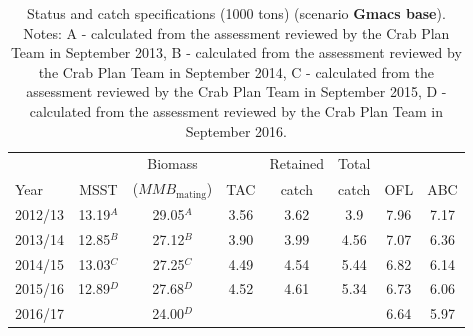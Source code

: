 \documentclass[]{article}
\begin{document}
\begin{table}[ht]
\centering
\caption{Status and catch specifications (1000 tons) (scenario {\bf Gmacs base}). Notes: A - calculated from the assessment reviewed by the Crab Plan Team in September 2013, B - calculated from the assessment reviewed by the Crab Plan Team in September 2014, C - calculated from the assessment reviewed by the Crab Plan Team in September 2015, D - calculated from the assessment reviewed by the Crab Plan Team in September 2016.} 
\label{tab:status}
\begin{tabular}{lccccccc}
\hline
          &          & Biomass                        &     & Retained & Total &     & \\ 
Year      & MSST     & ($\mathit{MMB}_\text{mating}$) & TAC & catch    & catch & OFL & ABC \\ 
\hline
2012/13   & 13.19$^A$   & 29.05$^A$   & 3.56 & 3.62 & 3.9  & 7.96 & 7.17 \\
2013/14   & 12.85$^B$   & 27.12$^B$   & 3.90 & 3.99 & 4.56 & 7.07 & 6.36 \\
2014/15   & 13.03$^C$   & 27.25$^C$   & 4.49 & 4.54 & 5.44 & 6.82 & 6.14 \\
2015/16   & 12.89$^D$   & 27.68$^D$   & 4.52 & 4.61 & 5.34 & 6.73 & 6.06 \\
2016/17   &             & 24.00$^D$   &      &      &      & 6.64 & 5.97 \\
\hline
\end{tabular}
\end{table}
\end{document}
